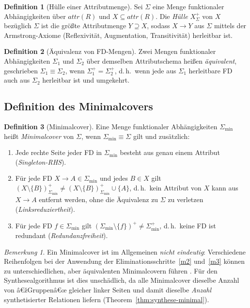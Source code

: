 ﻿\documentclass[a4paper,12pt]{report}
\theoremstyle{definition}
\newtheorem{definition}{Definition}[chapter]
\theoremstyle{remark}
\newtheorem{remark}{Bemerkung}[chapter]
\newcommand{\att}{\mathit{attr}}
\begin{document}
\begin{definition}[Hülle einer Attributmenge]
\label{def:attributhuelle}
Sei $\Sigma$ eine Menge funktionaler Abhängigkeiten über $\att(R)$ und
$X\subseteq\att(R)$. Die \emph{Hülle} $X^+_\Sigma$ von $X$ bezüglich
$\Sigma$ ist die größte Attributmenge $Y\supseteq X$, sodass
$X\to Y$ aus $\Sigma$ mittels der Armstrong-Axiome
\cite{Armstrong1974} (Reflexivität, Augmentation, Transitivität)
herleitbar ist.
\end{definition}

\begin{definition}[Äquivalenz von FD-Mengen]
\label{def:fd-aequivalent}
Zwei Mengen funktionaler Abhängigkeiten $\Sigma_1$ und $\Sigma_2$ über
demselben Attributschema heißen \emph{äquivalent}, geschrieben
$\Sigma_1 \equiv \Sigma_2$, wenn $\Sigma_1^+ = \Sigma_2^+$, d.\,h.\
wenn jede aus $\Sigma_1$ herleitbare FD auch aus $\Sigma_2$ herleitbar
ist und umgekehrt.
\end{definition}

\subsection{Definition des Minimalcovers}

\begin{definition}[Minimalcover]
\label{def:minimalcover}
Eine Menge funktionaler Abhängigkeiten $\Sigma_{\min}$ heißt
\emph{Minimalcover} von $\Sigma$, wenn $\Sigma_{\min}\equiv\Sigma$
gilt und zusätzlich:
\begin{enumerate}[label=(M\arabic*)]
  \item \label{m1} Jede rechte Seite jeder FD in $\Sigma_{\min}$
    besteht aus genau einem Attribut (\emph{Singleton-RHS}).
  \item \label{m2} Für jede FD $X\to A\in\Sigma_{\min}$ und jedes
    $B\in X$ gilt $(X\setminus\{B\})^+_{\Sigma_{\min}} \neq
    (X\setminus\{B\})^+_{\Sigma_{\min}}\cup\{A\}$, d.\,h.\ kein
    Attribut von $X$ kann aus $X\to A$ entfernt werden, ohne die
    Äquivalenz zu $\Sigma$ zu verletzen
    (\emph{Linksreduziertheit}).
  \item \label{m3} Für jede FD $f\in\Sigma_{\min}$ gilt
    $(\Sigma_{\min}\setminus\{f\})^+ \neq \Sigma_{\min}^+$, d.\,h.\
    keine FD ist redundant (\emph{Redundanzfreiheit}).
\end{enumerate}
\end{definition}

\begin{remark}
Ein Minimalcover ist im Allgemeinen \emph{nicht eindeutig}: Verschiedene
Reihenfolgen bei der Anwendung der Eliminationsschritte~\ref{m2}
und~\ref{m3} können zu unterschiedlichen, aber äquivalenten
Minimalcovern führen \cite{Ullman1988}. Für den Synthesealgorithmus ist
dies unschädlich, da alle Minimalcover dieselbe Anzahl von
â€žGruppenâ€œ gleicher linker Seiten und damit dieselbe \emph{Anzahl}
synthetisierter Relationen liefern (Theorem~\ref{thm:synthese-minimal}).
\end{remark}
\end{document}
